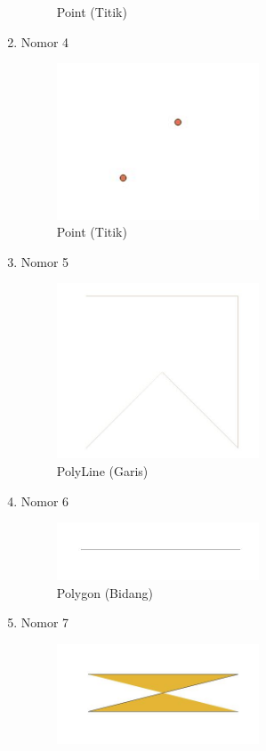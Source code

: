 \begin{enumerate}
\begin{figure}[H]
		\centering
		\caption{Point (Titik)}
	\end{figure}
	\item Nomor 4
	
	\begin{figure}[H]
		\includegraphics[width=6cm]{figures/Tugas2/1174086/No4.jpg}
		\centering
		\caption{Point (Titik)}
	\end{figure}
	\item Nomor 5
	
	\begin{figure}[H]
		\includegraphics[width=6cm]{figures/Tugas2/1174086/No5.jpg}
		\centering
		\caption{PolyLine (Garis)}
	\end{figure}
	\item Nomor 6
	
	\begin{figure}[H]
		\includegraphics[width=6cm]{figures/Tugas2/1174086/No6.jpg}
		\centering
		\caption{Polygon (Bidang)}
	\end{figure}
	\item Nomor 7
	
	\begin{figure}[H]
		\includegraphics[width=6cm]{figures/Tugas2/1174086/No7.jpg}

\end{figure}
\end{enumerate}
